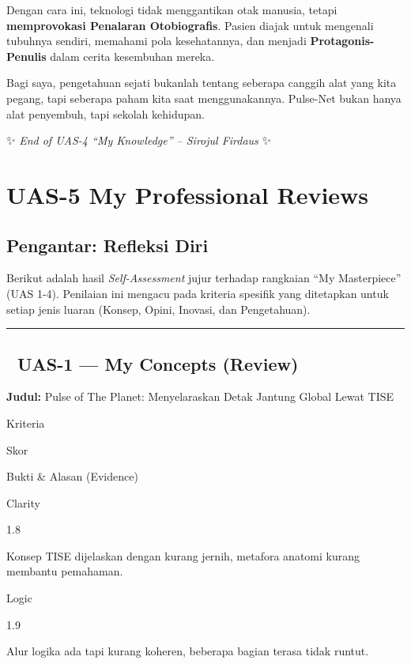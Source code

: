 \documentclass[
  letterpaper,
  DIV=11,
  numbers=noendperiod]{scrreprt}
\begin{document}
Dengan cara ini, teknologi tidak menggantikan otak manusia, tetapi
\textbf{memprovokasi Penalaran Otobiografis}. Pasien diajak untuk
mengenali tubuhnya sendiri, memahami pola kesehatannya, dan menjadi
\textbf{Protagonis-Penulis} dalam cerita kesembuhan mereka.

Bagi saya, pengetahuan sejati bukanlah tentang seberapa canggih alat
yang kita pegang, tapi seberapa paham kita saat menggunakannya.
Pulse-Net bukan hanya alat penyembuh, tapi sekolah kehidupan.

✨ \emph{End of UAS-4 ``My Knowledge'' -- Sirojul Firdaus} ✨

\chapter{UAS-5 My Professional
Reviews}\label{uas-5-my-professional-reviews}

\section{Pengantar: Refleksi Diri}\label{pengantar-refleksi-diri}

Berikut adalah hasil \emph{Self-Assessment} jujur terhadap rangkaian
``My Masterpiece'' (UAS 1-4). Penilaian ini mengacu pada kriteria
spesifik yang ditetapkan untuk setiap jenis luaran (Konsep, Opini,
Inovasi, dan Pengetahuan).

\begin{center}\rule{0.5\linewidth}{0.5pt}\end{center}

\section{🧩 UAS-1 --- My Concepts
(Review)}\label{uas-1-my-concepts-review}

\textbf{Judul:} Pulse of The Planet: Menyelaraskan Detak Jantung Global
Lewat TISE

Kriteria

Skor

Bukti \& Alasan (Evidence)

Clarity

1.8

Konsep TISE dijelaskan dengan kurang jernih, metafora anatomi kurang
membantu pemahaman.

Logic

1.9

Alur logika ada tapi kurang koheren, beberapa bagian terasa tidak
runtut.
\end{document}
